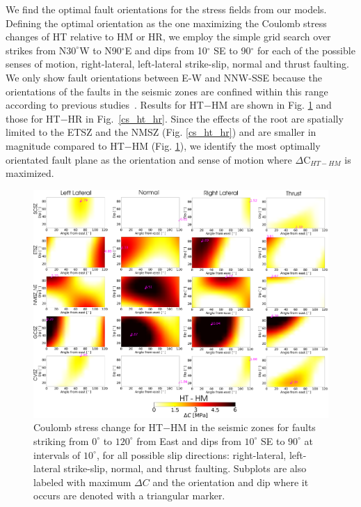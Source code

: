 \documentclass[draft,linenumbers]{agujournal2018}
\begin{document}
     We find the optimal fault orientations for the stress fields from our models. Defining the optimal orientation as the one maximizing the Coulomb stress changes of HT relative to HM or HR, we employ the simple grid search over strikes from N$30^\circ$W to N90$^\circ$E and dips from 10$^\circ$ SE to 90$^\circ$
     for each of the possible senses of motion, right-lateral, left-lateral strike-slip, normal and thrust faulting. We only show fault orientations between E-W and NNW-SSE because the orientations of the faults in the seismic zones are confined within this range according to previous studies~\citep{shumway2008focal, hurd2012intraplate, johnson2014earthquake, cooley2015new}. Results for HT$-$HM are shown in Fig. \ref{cs_ht_hm} and those for HT$-$HR in Fig.~\ref{cs_ht_hr}. Since the effects of the root are spatially limited to the ETSZ and the NMSZ (Fig. \ref{cs_ht_hr}) and are smaller in magnitude compared to HT$-$HM (Fig. \ref{cs_ht_hm}), we identify the most optimally orientated fault plane as the orientation and sense of motion where $\Delta$C$_{HT-HM}$ is maximized.
\begin{figure}[ht]
    \centering
    \includegraphics[width=\linewidth]{figures/ht_hm_summ.png}
    \caption{Coulomb stress change for HT$-$HM in the seismic zones for faults striking from $0^\circ$ to $120^\circ$ from East and dips from $10^\circ$ SE to $90^\circ$ at intervals of $10^\circ$, for all possible slip directions: right-lateral, left-lateral strike-slip, normal, and thrust faulting. Subplots are also labeled with maximum $\Delta C$ and the orientation and dip where it occurs are denoted with a triangular marker.}
    \label{cs_ht_hm}
\end{figure}
\end{document}
